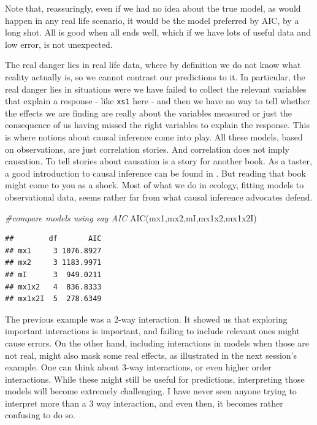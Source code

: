 \documentclass[
]{book}
\newenvironment{Shaded}{\begin{snugshade}}{\end{snugshade}}
\newcommand{\CommentTok}[1]{\textcolor[rgb]{0.56,0.35,0.01}{\textit{#1}}}
\newcommand{\FunctionTok}[1]{\textcolor[rgb]{0.00,0.00,0.00}{#1}}
\newcommand{\NormalTok}[1]{#1}
\begin{document}
Note that, reassuringly, even if we had no idea about the true model, as would happen in any real life scenario, it would be the model preferred by AIC, by a long shot. All is good when all ends well, which if we have lots of useful data and low error, is not unexpected.

The real danger lies in real life data, where by definition we do not know what reality actually is, so we cannot contrast our predictions to it. In particular, the real danger lies in situations were we have failed to collect the relevant variables that explain a response - like \texttt{xs1} here - and then we have no way to tell whether the effects we are finding are really about the variables measured or just the consequence of us having missed the right variables to explain the response. This is where notions about causal inference come into play. All these models, based on observations, are just correlation stories. And correlation does not imply causation. To tell stories about causation is a story for another book. As a taster, a good introduction to causal inference can be found in \citet{Hernan2020}. But reading that book might come to you as a shock. Most of what we do in ecology, fitting models to observational data, seems rather far from what causal inference advocates defend.

\begin{Shaded}
\begin{Highlighting}[]
\CommentTok{\#compare models using say AIC}
\FunctionTok{AIC}\NormalTok{(mx1,mx2,mI,mx1x2,mx1x2I)}
\end{Highlighting}
\end{Shaded}

\begin{verbatim}
##        df       AIC
## mx1     3 1076.8927
## mx2     3 1183.9971
## mI      3  949.0211
## mx1x2   4  836.8333
## mx1x2I  5  278.6349
\end{verbatim}

The previous example was a 2-way interaction. It showed us that exploring important interactions is important, and failing to include relevant ones might cause errors. On the other hand, including interactions in models when those are not real, might also mask some real effects, as illustrated in the next session's example. One can think about 3-way interactions, or even higher order interactions. While these might still be useful for predictions, interpreting those models will become extremely challenging. I have never seen anyone trying to interpret more than a 3 way interaction, and even then, it becomes rather confusing to do so.
\end{document}
